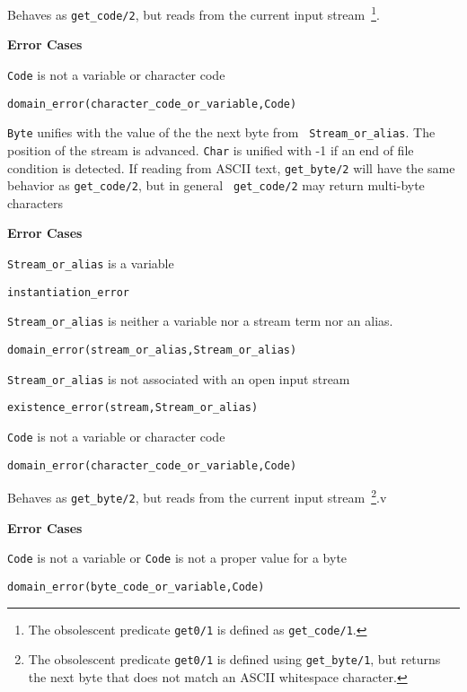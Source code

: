 \begin{description}
%
Behaves as {\tt get\_code/2}, but reads from the current input
stream~\footnote{The obsolescent predicate {\tt get0/1} is defined as
  {\tt get\_code/1}.}.

{\bf Error Cases}
\bi
\item 	{\tt Code} is not a variable or character code
\bi
\item 	{\tt domain\_error(character\_code\_or\_variable,Code)}
\ei
\ei

%
   {\tt Byte} unifies with the value of the the next byte from {\tt
     Stream\_or\_alias}.  The position of the stream is advanced.
   {\tt Char} is unified with -1 if an end of file condition is
   detected.  If reading from ASCII text, {\tt get\_byte/2} will have
   the same behavior as {\tt get\_code/2}, but in general {\tt
     get\_code/2} may return multi-byte characters

{\bf Error Cases}
\bi
\item 	{\tt Stream\_or\_alias} is a variable
\bi
\item {\tt instantiation\_error}
\ei
\item 	{\tt Stream\_or\_alias} is neither a variable nor a stream term nor an alias.
\bi
\item 	{\tt domain\_error(stream\_or\_alias,Stream\_or\_alias)}
\ei
\item 	{\tt Stream\_or\_alias} is not associated with an open input stream
\bi
\item 	{\tt existence\_error(stream,Stream\_or\_alias)}
\ei
\item 	{\tt Code} is not a variable or character code
\bi
\item 	{\tt domain\_error(character\_code\_or\_variable,Code)}
\ei
\ei

 Behaves as {\tt get\_byte/2}, but
reads from the current input stream~\footnote{The obsolescent
  predicate {\tt get0/1} is defined using {\tt get\_byte/1}, but
  returns the next byte that does not match an ASCII whitespace
  character.}.v

{\bf Error Cases}
\bi
\item 	{\tt Code} is not a variable or {\tt Code} is not a proper value for a byte
\bi
\item 	{\tt domain\_error(byte\_code\_or\_variable,Code)}
\ei
\ei

%


\end{description}
